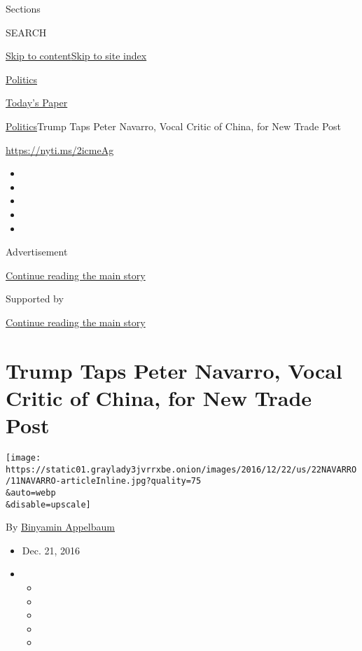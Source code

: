 Sections

SEARCH

\protect\hyperlink{site-content}{Skip to
content}\protect\hyperlink{site-index}{Skip to site index}

\href{https://www.nytimes3xbfgragh.onion/section/politics}{Politics}

\href{https://myaccount.nytimes3xbfgragh.onion/auth/login?response_type=cookie\&client_id=vi}{}

\href{https://www.nytimes3xbfgragh.onion/section/todayspaper}{Today's
Paper}

\href{/section/politics}{Politics}\textbar{}Trump Taps Peter Navarro,
Vocal Critic of China, for New Trade Post

\url{https://nyti.ms/2icmeAg}

\begin{itemize}
\item
\item
\item
\item
\item
\end{itemize}

Advertisement

\protect\hyperlink{after-top}{Continue reading the main story}

Supported by

\protect\hyperlink{after-sponsor}{Continue reading the main story}

\hypertarget{trump-taps-peter-navarro-vocal-critic-of-china-for-new-trade-post}{%
\section{Trump Taps Peter Navarro, Vocal Critic of China, for New Trade
Post}\label{trump-taps-peter-navarro-vocal-critic-of-china-for-new-trade-post}}

\texttt{[image: https://static01.graylady3jvrrxbe.onion/images/2016/12/22/us/22NAVARRO/11NAVARRO-articleInline.jpg?quality=75\\\&auto=webp\\\&disable=upscale]}

By
\href{http://www.nytimes3xbfgragh.onion/by/binyamin-appelbaum}{Binyamin
Appelbaum}

\begin{itemize}
\item
  Dec. 21, 2016
\item
  \begin{itemize}
  \item
  \item
  \item
  \item
  \item
  \end{itemize}
\end{itemize}

